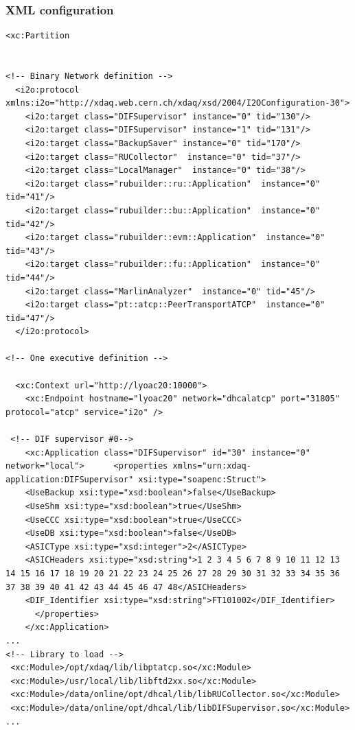 \documentclass[10pt]{beamer}
\begin{document}
\begin{frame}[fragile,shrink=60]
\frametitle{XML configuration}

\begin{verbatim}
<xc:Partition 
   

<!-- Binary Network definition -->
  <i2o:protocol xmlns:i2o="http://xdaq.web.cern.ch/xdaq/xsd/2004/I2OConfiguration-30">
    <i2o:target class="DIFSupervisor" instance="0" tid="130"/>
    <i2o:target class="DIFSupervisor" instance="1" tid="131"/>
    <i2o:target class="BackupSaver" instance="0" tid="170"/>
    <i2o:target class="RUCollector"  instance="0" tid="37"/>
    <i2o:target class="LocalManager"  instance="0" tid="38"/>
    <i2o:target class="rubuilder::ru::Application"  instance="0" tid="41"/>
    <i2o:target class="rubuilder::bu::Application"  instance="0" tid="42"/>
    <i2o:target class="rubuilder::evm::Application"  instance="0" tid="43"/>
    <i2o:target class="rubuilder::fu::Application"  instance="0" tid="44"/>
    <i2o:target class="MarlinAnalyzer"  instance="0" tid="45"/>
    <i2o:target class="pt::atcp::PeerTransportATCP"  instance="0" tid="47"/>
  </i2o:protocol>

<!-- One executive definition -->

  <xc:Context url="http://lyoac20:10000">
    <xc:Endpoint hostname="lyoac20" network="dhcalatcp" port="31805" protocol="atcp" service="i2o" />

 <!-- DIF supervisor #0-->
    <xc:Application class="DIFSupervisor" id="30" instance="0"  network="local">      <properties xmlns="urn:xdaq-application:DIFSupervisor" xsi:type="soapenc:Struct">
	<UseBackup xsi:type="xsd:boolean">false</UseBackup>
	<UseShm xsi:type="xsd:boolean">true</UseShm>	
	<UseCCC xsi:type="xsd:boolean">true</UseCCC>
	<UseDB xsi:type="xsd:boolean">false</UseDB>	
	<ASICType xsi:type="xsd:integer">2</ASICType>
	<ASICHeaders xsi:type="xsd:string">1 2 3 4 5 6 7 8 9 10 11 12 13 14 15 16 17 18 19 20 21 22 23 24 25 26 27 28 29 30 31 32 33 34 35 36 37 38 39 40 41 42 43 44 45 46 47 48</ASICHeaders>
	<DIF_Identifier xsi:type="xsd:string">FT101002</DIF_Identifier>
      </properties>
    </xc:Application>
...
<!-- Library to load -->
 <xc:Module>/opt/xdaq/lib/libptatcp.so</xc:Module>
 <xc:Module>/usr/local/lib/libftd2xx.so</xc:Module>
 <xc:Module>/data/online/opt/dhcal/lib/libRUCollector.so</xc:Module>
 <xc:Module>/data/online/opt/dhcal/lib/libDIFSupervisor.so</xc:Module>
...
\end{verbatim}

\end{frame}
\end{document}
